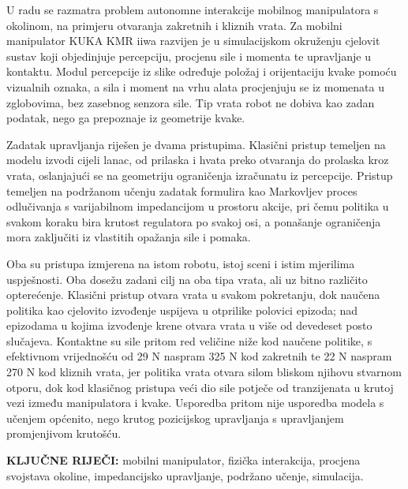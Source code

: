 
U radu se razmatra problem autonomne interakcije mobilnog manipulatora s okolinom, na primjeru
otvaranja zakretnih i kliznih vrata. Za mobilni manipulator KUKA KMR iiwa razvijen
je u simulacijskom okruženju cjelovit sustav koji objedinjuje percepciju, procjenu sile i
momenta te upravljanje u kontaktu. Modul percepcije iz slike određuje položaj i orijentaciju
kvake pomoću vizualnih oznaka, a sila i moment na vrhu alata procjenjuju se iz momenata u
zglobovima, bez zasebnog senzora sile. Tip vrata robot ne dobiva kao zadan podatak, nego ga
prepoznaje iz geometrije kvake.

Zadatak upravljanja riješen je dvama pristupima. Klasični pristup temeljen na modelu izvodi
cijeli lanac, od prilaska i hvata preko otvaranja do prolaska kroz vrata, oslanjajući se na
geometriju ograničenja izračunatu iz percepcije. Pristup temeljen na podržanom učenju zadatak
formulira kao Markovljev proces odlučivanja s varijabilnom impedancijom u prostoru akcije, pri
čemu politika u svakom koraku bira krutost regulatora po svakoj osi, a ponašanje ograničenja
mora zaključiti iz vlastitih opažanja sile i pomaka.

Oba su pristupa izmjerena na istom robotu, istoj sceni i istim mjerilima uspješnosti. Oba dosežu
zadani cilj na oba tipa vrata, ali uz bitno različito opterećenje. Klasični pristup otvara
vrata u svakom pokretanju, dok naučena politika kao cjelovito izvođenje uspijeva u otprilike
polovici epizoda; nad epizodama u kojima izvođenje krene otvara vrata u više od devedeset posto
slučajeva. Kontaktne su sile pritom red veličine niže kod naučene politike, s efektivnom
vrijednošću od 29 N naspram 325 N kod zakretnih te 22 N naspram 270 N kod kliznih vrata, jer
politika vrata otvara silom bliskom njihovu stvarnom otporu, dok kod klasičnog pristupa veći dio
sile potječe od tranzijenata u krutoj vezi između manipulatora i kvake. Usporedba pritom nije
usporedba modela s učenjem općenito, nego krutog pozicijskog upravljanja s upravljanjem
promjenjivom krutošću.

\vspace{8mm}
\noindent\textbf{KLJUČNE RIJEČI:} mobilni manipulator, fizička interakcija, procjena
svojstava okoline, impedancijsko upravljanje, podržano učenje, simulacija.
\clearpage